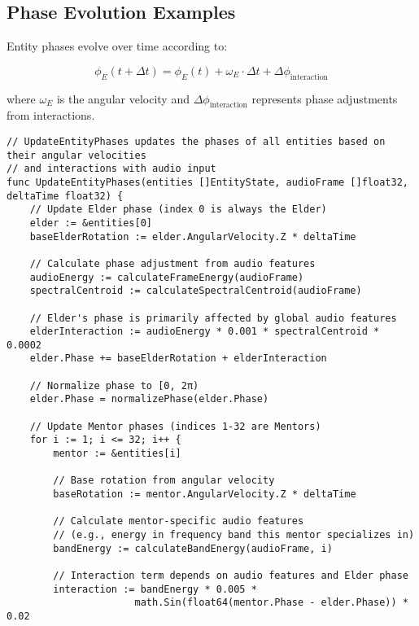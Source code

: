 \subsection{Phase Evolution Examples}

Entity phases evolve over time according to:

\begin{equation}
\phi_E(t+\Delta t) = \phi_E(t) + \omega_E \cdot \Delta t + \Delta \phi_{\text{interaction}}
\end{equation}

where $\omega_E$ is the angular velocity and $\Delta \phi_{\text{interaction}}$ represents phase adjustments from interactions.

\begin{tcolorbox}[colback=CodeBackground, colframe=DarkGray, title=Phase Evolution Code in Go, fonttitle=\bfseries]
\begin{verbatim}
// UpdateEntityPhases updates the phases of all entities based on their angular velocities
// and interactions with audio input
func UpdateEntityPhases(entities []EntityState, audioFrame []float32, deltaTime float32) {
    // Update Elder phase (index 0 is always the Elder)
    elder := &entities[0]
    baseElderRotation := elder.AngularVelocity.Z * deltaTime
    
    // Calculate phase adjustment from audio features
    audioEnergy := calculateFrameEnergy(audioFrame)
    spectralCentroid := calculateSpectralCentroid(audioFrame)
    
    // Elder's phase is primarily affected by global audio features
    elderInteraction := audioEnergy * 0.001 * spectralCentroid * 0.0002
    elder.Phase += baseElderRotation + elderInteraction
    
    // Normalize phase to [0, 2π)
    elder.Phase = normalizePhase(elder.Phase)
    
    // Update Mentor phases (indices 1-32 are Mentors)
    for i := 1; i <= 32; i++ {
        mentor := &entities[i]
        
        // Base rotation from angular velocity
        baseRotation := mentor.AngularVelocity.Z * deltaTime
        
        // Calculate mentor-specific audio features 
        // (e.g., energy in frequency band this mentor specializes in)
        bandEnergy := calculateBandEnergy(audioFrame, i)
        
        // Interaction term depends on audio features and Elder phase
        interaction := bandEnergy * 0.005 * 
                      math.Sin(float64(mentor.Phase - elder.Phase)) * 0.02
        

\end{verbatim}
\end{tcolorbox}
